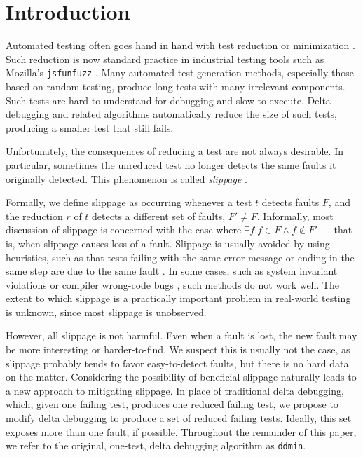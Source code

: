 \section{Introduction}

Automated testing often goes hand in hand with
test reduction or minimization \cite{DD,MinUnit,TCminim,ICSEDiff,CReduce}.
Such reduction is
now standard practice in industrial testing tools such as Mozilla's
{\tt jsfunfuzz} \cite{jsfunfuzz,jsfunfuzz2,lithium}.  Many automated
test generation methods, especially those based on random testing,
produce long tests with many irrelevant components.  Such tests are
hard to understand for debugging and slow to execute.  Delta debugging
and related algorithms automatically reduce the size of such tests,
producing a smaller test that still fails.

Unfortunately, the consequences of reducing a test are not always
desirable.  In particular, sometimes the unreduced test no longer
detects the same faults it originally detected.  This phenomenon is
called \emph{slippage} \cite{PLDI13}.  

Formally, we define slippage as occurring whenever a test $t$ detects
faults $F$, and the reduction $r$ of $t$ detects a different set of
faults, $F' \neq F$.  Informally, most discussion of slippage is
concerned with the case where
$\exists f .  f \in F \wedge f \not\in F'$ --- that is, when slippage
causes loss of a fault.  Slippage is usually avoided by using
heuristics, such as that tests failing with the same error message or
ending in the same step are due to the same fault \cite{ICSEDiff}.  In
some cases, such as system invariant violations or compiler wrong-code
bugs \cite{PLDI13}, such methods do not work well.  The extent to
which slippage is a practically important problem in real-world
testing is unknown, since most slippage is unobserved.

However, all slippage is not
harmful.  Even when a fault is lost, the new fault may be more
interesting or harder-to-find.  We suspect this is usually not the
case, as slippage probably tends to favor easy-to-detect faults, but
there is no hard data on the matter.  Considering the
possibility of beneficial slippage naturally leads to a new approach to
mitigating slippage.  In place of traditional delta debugging, which,
given one failing test, produces one reduced failing test, we propose
to modify delta debugging to produce a set of reduced
failing tests.  Ideally, this set exposes more than one fault, if possible.
Throughout the remainder of this paper, we refer to the original,
one-test, delta debugging algorithm \cite{DD} as {\tt ddmin}.  

